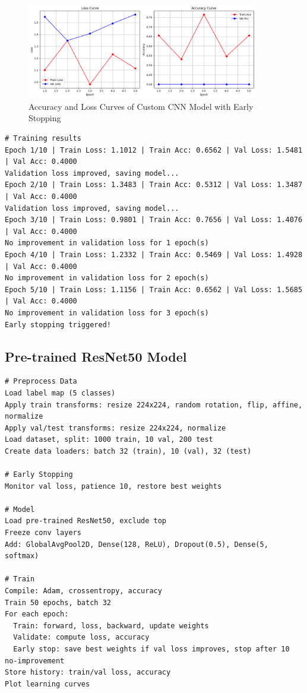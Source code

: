 \documentclass[a4paper,12pt]{article}
\begin{document}
\begin{figure}[H]
    \centering
    \includegraphics[width=0.9\textwidth]{assets/cassava/early_custom_loss_accu.png}
    \caption{Accuracy and Loss Curves of Custom CNN Model with Early Stopping}
\end{figure}

\begin{verbatim}
# Training results
Epoch 1/10 | Train Loss: 1.1012 | Train Acc: 0.6562 | Val Loss: 1.5481 | Val Acc: 0.4000
Validation loss improved, saving model...
Epoch 2/10 | Train Loss: 1.3483 | Train Acc: 0.5312 | Val Loss: 1.3487 | Val Acc: 0.4000
Validation loss improved, saving model...
Epoch 3/10 | Train Loss: 0.9801 | Train Acc: 0.7656 | Val Loss: 1.4076 | Val Acc: 0.4000
No improvement in validation loss for 1 epoch(s)
Epoch 4/10 | Train Loss: 1.2332 | Train Acc: 0.5469 | Val Loss: 1.4928 | Val Acc: 0.4000
No improvement in validation loss for 2 epoch(s)
Epoch 5/10 | Train Loss: 1.1156 | Train Acc: 0.6562 | Val Loss: 1.5685 | Val Acc: 0.4000
No improvement in validation loss for 3 epoch(s)
Early stopping triggered!
\end{verbatim}


\clearpage %
\subsection*{Pre-trained ResNet50 Model}
\begin{lstlisting}
# Preprocess Data
Load label map (5 classes)
Apply train transforms: resize 224x224, random rotation, flip, affine, normalize
Apply val/test transforms: resize 224x224, normalize
Load dataset, split: 1000 train, 10 val, 200 test
Create data loaders: batch 32 (train), 10 (val), 32 (test)

# Early Stopping
Monitor val loss, patience 10, restore best weights

# Model
Load pre-trained ResNet50, exclude top
Freeze conv layers
Add: GlobalAvgPool2D, Dense(128, ReLU), Dropout(0.5), Dense(5, softmax)

# Train
Compile: Adam, crossentropy, accuracy
Train 50 epochs, batch 32
For each epoch:
  Train: forward, loss, backward, update weights
  Validate: compute loss, accuracy
  Early stop: save best weights if val loss improves, stop after 10 no-improvement
Store history: train/val loss, accuracy
Plot learning curves
\end{lstlisting}
\end{document}
